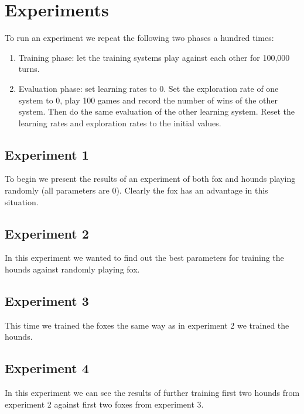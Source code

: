 \documentclass[a4paper]{article}
\begin{document}
\section{Experiments}
To run an experiment we repeat the following two phases a hundred times:
\begin{enumerate}
    \item Training phase: let the training systems play against each other for
        100,000 turns.
    \item Evaluation phase: set learning rates to 0. Set the exploration
        rate of one system to 0, play 100 games and record the number of wins
        of the other system. Then do the same evaluation of the other learning
        system. Reset the learning rates and exploration rates to the initial
        values.
\end{enumerate}

\subsection{Experiment 1}
To begin we present the results of an experiment of both fox and hounds playing
randomly (all parameters are 0). Clearly the fox has an advantage in this
situation.



\subsection{Experiment 2}
In this experiment we wanted to find out the best parameters for training the
hounds against randomly playing fox.





\subsection{Experiment 3}
This time we trained the foxes the same way as in experiment 2 we trained the
hounds.





\subsection{Experiment 4}
In this experiment we can see the results of further training first two hounds
from experiment 2 against first two foxes from experiment 3.
\end{document}
